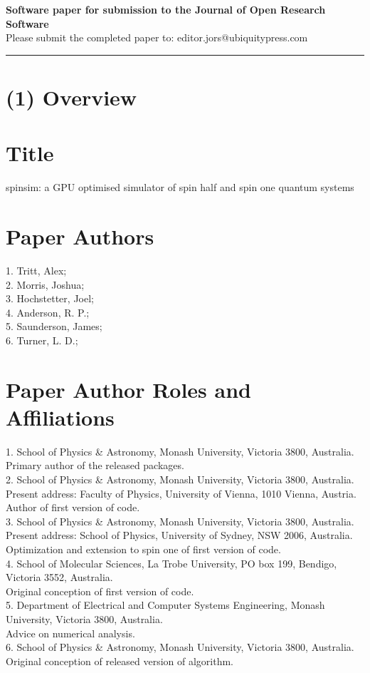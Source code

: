 \documentclass{jors}
\begin{document}
{\bf Software paper for submission to the Journal of Open Research Software} \\

Please submit the completed paper to: editor.jors@ubiquitypress.com

\rule{\textwidth}{1pt}

\section*{(1) Overview}

\vspace{0.5cm}

\section*{Title}
spinsim: a GPU optimised simulator of spin half and spin one quantum systems

\section*{Paper Authors}
1. Tritt, Alex;\\
2. Morris, Joshua;\\
3. Hochstetter, Joel;\\
4. Anderson, R. P.;\\
5. Saunderson, James;\\
6. Turner, L. D.;\\

\section*{Paper Author Roles and Affiliations}
1. School of Physics \& Astronomy, Monash University, Victoria 3800, Australia.\\
	Primary author of the released packages.\\
2. School of Physics \& Astronomy, Monash University, Victoria 3800, Australia.\\
	Present address: Faculty of Physics, University of Vienna, 1010 Vienna, Austria.\\
	Author of first version of code.\\
3. School of Physics \& Astronomy, Monash University, Victoria 3800, Australia.\\
	Present address: School of Physics, University of Sydney, NSW 2006, Australia.\\
	Optimization and extension to spin one of first version of code.\\
4. School of Molecular Sciences, La Trobe University, PO box 199, Bendigo, Victoria 3552, Australia.\\
	Original conception of first version of code.\\
5. Department of Electrical and Computer Systems Engineering, Monash University, Victoria 3800, Australia.\\
	Advice on numerical analysis.\\
6. School of Physics \& Astronomy, Monash University, Victoria 3800, Australia.\\
	Original conception of released version of algorithm.
\end{document}
